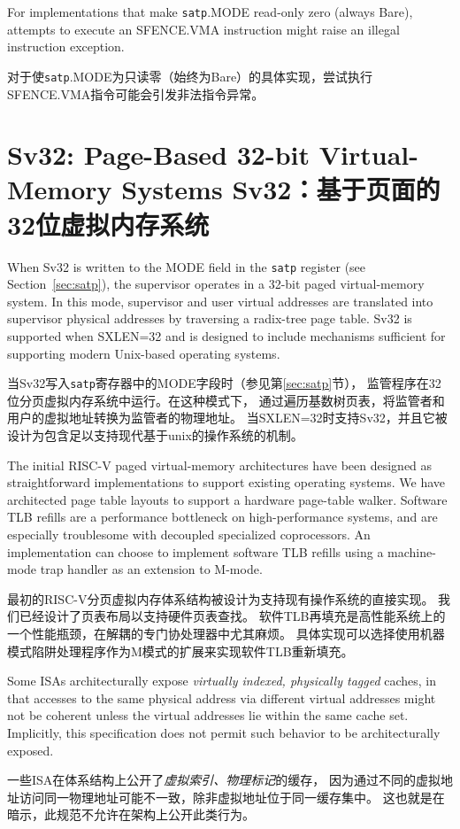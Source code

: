 For implementations that make {\tt satp}.MODE read-only zero (always Bare), attempts to
execute an SFENCE.VMA instruction might raise an illegal instruction
exception.

对于使{\tt satp}.MODE为只读零（始终为Bare）的具体实现，尝试执行SFENCE.VMA指令可能会引发非法指令异常。

\section{Sv32: Page-Based 32-bit Virtual-Memory Systems Sv32：基于页面的32位虚拟内存系统}
\label{sec:sv32}

When Sv32 is written to the MODE field in the {\tt satp} register (see
Section~\ref{sec:satp}), the supervisor operates in a 32-bit paged
virtual-memory system.  In this mode, supervisor and user virtual addresses
are translated into supervisor physical addresses by traversing a radix-tree
page table.  Sv32 is supported when SXLEN=32 and is designed to include
mechanisms sufficient for supporting modern Unix-based operating systems.

当Sv32写入{\tt satp}寄存器中的MODE字段时（参见第\ref{sec:satp}节），
监管程序在32位分页虚拟内存系统中运行。在这种模式下，
通过遍历基数树页表，将监管者和用户的虚拟地址转换为监管者的物理地址。
当SXLEN=32时支持Sv32，并且它被设计为包含足以支持现代基于unix的操作系统的机制。

\begin{commentary}
The initial RISC-V paged virtual-memory architectures have been
designed as straightforward implementations to support existing
operating systems.  We have architected page table layouts to support
a hardware page-table walker.  Software TLB refills are a performance
bottleneck on high-performance systems, and are especially troublesome
with decoupled specialized coprocessors.  An implementation can choose
to implement software TLB refills using a machine-mode trap handler as
an extension to M-mode.

最初的RISC-V分页虚拟内存体系结构被设计为支持现有操作系统的直接实现。
我们已经设计了页表布局以支持硬件页表查找。
软件TLB再填充是高性能系统上的一个性能瓶颈，在解耦的专门协处理器中尤其麻烦。
具体实现可以选择使用机器模式陷阱处理程序作为M模式的扩展来实现软件TLB重新填充。
\end{commentary}

\begin{commentary}

Some ISAs architecturally expose \emph{virtually indexed, physically tagged}
caches, in that accesses to the same physical address via different virtual
addresses might not be coherent unless the virtual addresses lie within the
same cache set.
Implicitly, this specification does not permit such behavior to be
architecturally exposed.

一些ISA在体系结构上公开了\emph{虚拟索引、物理标记}的缓存，
因为通过不同的虚拟地址访问同一物理地址可能不一致，除非虚拟地址位于同一缓存集中。
这也就是在暗示，此规范不允许在架构上公开此类行为。
\end{commentary}

